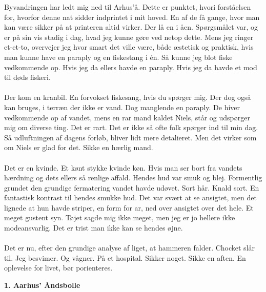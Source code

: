 \documentclass[]{article}
\begin{document}
Byvandringen har ledt mig ned til Arhus’å. Dette er punktet, hvori forståelsen for, hvorfor denne nat sidder indprintet i mit hoved. En af de få gange, hvor man kan være sikker på at printeren altid virker. Der lå en i åen. Spørgsmålet var, og er på sin vis stadig i dag, hvad jeg kunne gøre ved netop dette. Mens jeg ringer et-et-to, overvejer jeg hvor smart det ville være, både æstetisk og praktisk, hvis man kunne have en paraply og en fiskestang i én. Så kunne jeg blot fiske vedkommende op. Hvis jeg da ellers havde en paraply. Hvis jeg da havde et mod til døds fiskeri.
\\ \\
Der kom en kranbil. En forvokset fiskesang, hvis du spørger mig. Der dog også kan bruges, i terræn der ikke er vand. Dog manglende en paraply. De hiver vedkommende op af vandet, mens en rar mand kaldet Niels, står og udspørger mig om diverse ting. Det er rart. Det er ikke så ofte folk spørger ind til min dag. Så udluftningen af dagens forløb, bliver lidt mere detalieret. Men det virker som om Niels er glad for det. Sikke en hærlig mand.
\\ \\
Det er en kvinde. Et kønt stykke kvinde køn. Hvis man ser bort fra vandets hærdning og dets ellers så renlige affald. Hendes hud var smuk og blej. Formentlig grundet den grundige fermatering vandet havde udøvet. Sort hår. Knald sort. En fantastisk kontrast til hendes smukke hud. Det var svært at se ansigtet, men det lignede at hun havde striper, en form for ar, ned over ansigtet over det hele. Et meget gustent syn. Tøjet sagde mig ikke meget, men jeg er jo hellere ikke modeansvarlig. Det er trist man ikke kan se hendes øjne.
\\ \\
Det er nu, efter den grundige analyse af liget, at hammeren falder. Chocket slår til. Jeg besvimer. Og vågner. På et hospital. Sikker noget. Sikke en aften. En oplevelse for livet, bør porienteres.


\begin{center}
	\large\textbf{1. Aarhus' Åndsbolle}
\end{center}
\end{document}

